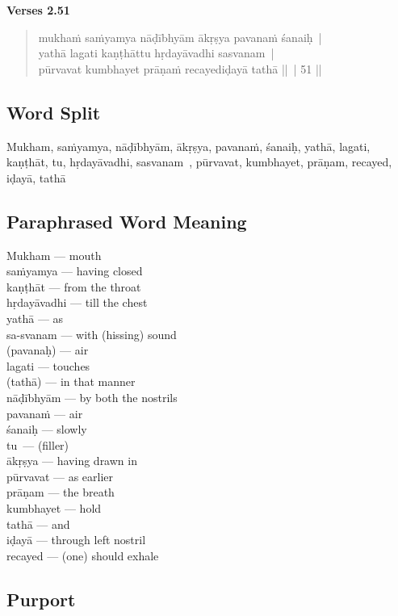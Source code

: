 \noindent \textbf{Verses 2.51}

\begin{verse}
mukhaṁ saṁyamya nāḍībhyām ākṛṣya pavanaṁ śanaiḥ |\\
yathā lagati kaṇṭhāttu hṛdayāvadhi sasvanam |\\
pūrvavat kumbhayet prāṇaṁ recayediḍayā tathā || | 51 ||
\end{verse}

\subsection*{Word Split}

Mukham, saṁyamya, nāḍībhyām, ākṛṣya, pavanaṁ, śanaiḥ, yathā, lagati, kaṇṭhāt, tu, hṛdayāvadhi, sasvanam , pūrvavat, kumbhayet, prāṇam, recayed, iḍayā, tathā

\subsection*{Paraphrased Word Meaning}

\begin{multicols}{2}
Mukham --- mouth\\
saṁyamya --- having closed\\
kaṇṭhāt --- from the throat\\
hṛdayāvadhi --- till the chest\\
yathā --- as\\
sa-svanam --- with (hissing) sound\\
(pavanaḥ) --- air\\
lagati --- touches\\
(tathā) --- in that manner\\
nāḍībhyām --- by both the nostrils\\
pavanaṁ --- air\\
śanaiḥ --- slowly\\
tu --- (filler)\\
ākṛṣya --- having drawn in \\
pūrvavat --- as earlier \\
prāṇam --- the breath \\
kumbhayet --- hold \\
tathā --- and \\
iḍayā --- through left nostril\\
recayed --- (one) should exhale
\end{multicols}

\subsection*{Purport}

